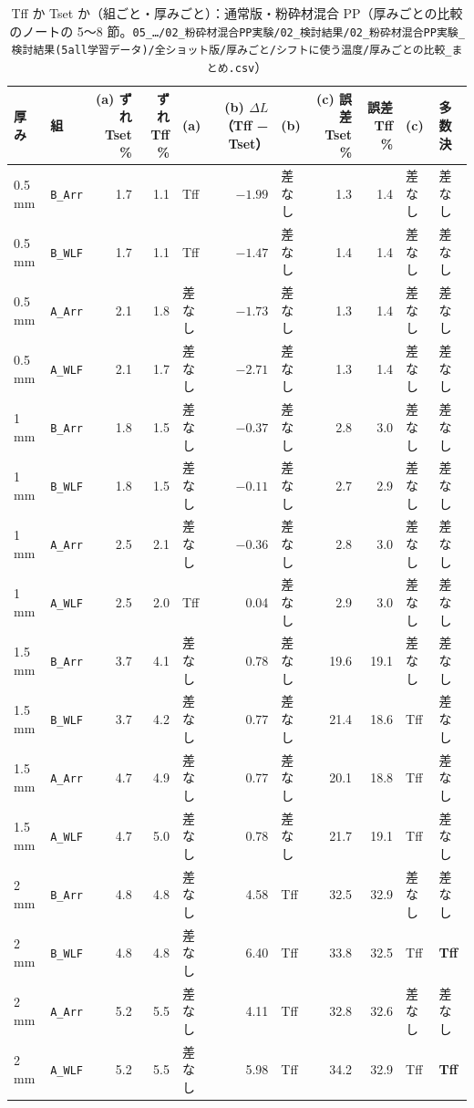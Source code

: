 \documentclass[paper=a4paper,landscape,fontsize=10pt,line_length=62zw,number_of_lines=34]{jlreq}
\let\origtextbf\textbf
\renewcommand{\textbf}[1]{\origtextbf{\gtfamily #1}}   %
\begin{document}
\begin{table}[H]\centering\footnotesize
\caption{Tff か Tset か（組ごと・厚みごと）：通常版・粉砕材混合 PP（厚みごとの比較のノートの 5〜8 節。\texttt{05\_\allowbreak{}…/\allowbreak{}02\_\allowbreak{}粉砕材混合PP実験/\allowbreak{}02\_\allowbreak{}検討結果/\allowbreak{}02\_\allowbreak{}粉砕材混合PP実験\_\allowbreak{}検討結果(5all学習データ)/\allowbreak{}全ショット版/\allowbreak{}厚みごと/\allowbreak{}シフトに使う温度/\allowbreak{}厚みごとの比較\_\allowbreak{}まとめ.csv}）}
\begin{tabular}{llrrlrlrrll}
\toprule
厚み & 組 & (a) ずれ Tset \% & ずれ Tff \% & (a) & (b) $\Delta L$（Tff − Tset） & (b) & (c) 誤差 Tset \% & 誤差 Tff \% & (c) & 多数決 \\
\midrule
0.5 mm & \texttt{B\_\allowbreak{}Arr} & 1.7 & 1.1 & Tff & $-1.99$ & 差なし & 1.3 & 1.4 & 差なし & 差なし \\
0.5 mm & \texttt{B\_\allowbreak{}WLF} & 1.7 & 1.1 & Tff & $-1.47$ & 差なし & 1.4 & 1.4 & 差なし & 差なし \\
0.5 mm & \texttt{A\_\allowbreak{}Arr} & 2.1 & 1.8 & 差なし & $-1.73$ & 差なし & 1.3 & 1.4 & 差なし & 差なし \\
0.5 mm & \texttt{A\_\allowbreak{}WLF} & 2.1 & 1.7 & 差なし & $-2.71$ & 差なし & 1.3 & 1.4 & 差なし & 差なし \\
1 mm & \texttt{B\_\allowbreak{}Arr} & 1.8 & 1.5 & 差なし & $-0.37$ & 差なし & 2.8 & 3.0 & 差なし & 差なし \\
1 mm & \texttt{B\_\allowbreak{}WLF} & 1.8 & 1.5 & 差なし & $-0.11$ & 差なし & 2.7 & 2.9 & 差なし & 差なし \\
1 mm & \texttt{A\_\allowbreak{}Arr} & 2.5 & 2.1 & 差なし & $-0.36$ & 差なし & 2.8 & 3.0 & 差なし & 差なし \\
1 mm & \texttt{A\_\allowbreak{}WLF} & 2.5 & 2.0 & Tff & 0.04 & 差なし & 2.9 & 3.0 & 差なし & 差なし \\
1.5 mm & \texttt{B\_\allowbreak{}Arr} & 3.7 & 4.1 & 差なし & 0.78 & 差なし & 19.6 & 19.1 & 差なし & 差なし \\
1.5 mm & \texttt{B\_\allowbreak{}WLF} & 3.7 & 4.2 & 差なし & 0.77 & 差なし & 21.4 & 18.6 & Tff & 差なし \\
1.5 mm & \texttt{A\_\allowbreak{}Arr} & 4.7 & 4.9 & 差なし & 0.77 & 差なし & 20.1 & 18.8 & Tff & 差なし \\
1.5 mm & \texttt{A\_\allowbreak{}WLF} & 4.7 & 5.0 & 差なし & 0.78 & 差なし & 21.7 & 19.1 & Tff & 差なし \\
2 mm & \texttt{B\_\allowbreak{}Arr} & 4.8 & 4.8 & 差なし & 4.58 & Tff & 32.5 & 32.9 & 差なし & 差なし \\
2 mm & \texttt{B\_\allowbreak{}WLF} & 4.8 & 4.8 & 差なし & 6.40 & Tff & 33.8 & 32.5 & Tff & \textbf{Tff} \\
2 mm & \texttt{A\_\allowbreak{}Arr} & 5.2 & 5.5 & 差なし & 4.11 & Tff & 32.8 & 32.6 & 差なし & 差なし \\
2 mm & \texttt{A\_\allowbreak{}WLF} & 5.2 & 5.5 & 差なし & 5.98 & Tff & 34.2 & 32.9 & Tff & \textbf{Tff} \\
\bottomrule
\end{tabular}
\end{table}
\clearpage
\end{document}
